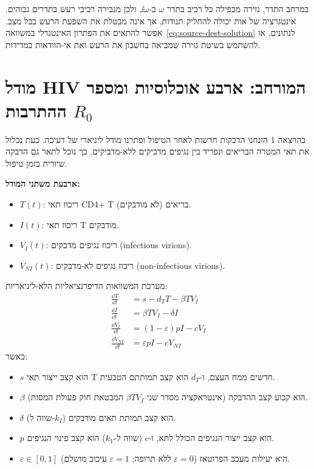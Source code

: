 \begin{remark}
במרחב התדר, גזירה מכפילה כל רכיב בתדר $\omega$ ב-$\ii\omega$, ולכן מגבירה רכיבי רעש בתדרים גבוהים. אינטגרציה של אות יכולה להחליק תנודות, אך אינה מבטלת את השפעת הרעש בכל מצב. אפשר להתאים את הפתרון האינטגרלי במשוואה~\eqref{eq:source-dest-solution} לנתונים, או להשתמש בשיטת גזירה שמביאה בחשבון את הרעש ואת אי-הוודאות במדידות.
\end{remark}

\section{מודל HIV המורחב: ארבע אוכלוסיות ומספר ההתרבות \texorpdfstring{$R_0$}{R0}}\label{sec:hiv-4pop}
בהרצאה 1 הזנחנו הדבקות חדשות לאחר הטיפול ופתרנו מודל ליניארי של דעיכה. כעת נכלול את תאי המטרה הבריאים ונפריד בין נגיפים מדביקים ללא-מדביקים. כך נוכל לתאר גם הדבקה שיורית בזמן טיפול.

\textbf{ארבעת משתני המודל:}
\begin{itemize}
\item $T(t)$: ריכוז תאי CD4+ T בריאים (לא מודבקים).
\item $I(t)$: ריכוז תאי T מודבקים.
\item $V_I(t)$: ריכוז נגיפים מדבקים (\textenglish{infectious virions}).
\item $V_{NI}(t)$: ריכוז נגיפים לא-מדבקים (\textenglish{non-infectious virions}).
\end{itemize}

מערכת המשוואות הדיפרנציאליות הלא-ליניאריות:
\begin{align}
\frac{\dd T}{\dd t} &= s - d_T T - \beta T V_I \label{eq:hiv4-T}\\
\frac{\dd I}{\dd t} &= \beta T V_I - \delta I \label{eq:hiv4-I}\\
\frac{\dd V_I}{\dd t} &= (1-\varepsilon) p I - c V_I \label{eq:hiv4-VI}\\
\frac{\dd V_{NI}}{\dd t} &= \varepsilon p I - c V_{NI} \label{eq:hiv4-VNI}
\end{align}
כאשר:
\begin{itemize}
\item $s$ הוא קצב ייצור תאי T חדשים ממח העצם, ו-$d_T$ הוא קצב תמותתם הטבעית.
\item $\beta$ הוא קבוע קצב ההדבקה (אינטראקציה מסדר שני $\beta T V_I$ המבטאת חוק פעולת המסות).
\item $\delta$ (שווה ל-$k_I$) הוא קצב תמותת תאים מודבקים.
\item $p$ הוא קצב ייצור הנגיפים הכולל לתא, ו-$c$ (שווה ל-$k_V$) הוא קצב פינוי הנגיפים.
\item $\varepsilon \in [0, 1]$ היא יעילות מעכב הפרוטאז ($\varepsilon=0$ ללא תרופה; $\varepsilon=1$ עיכוב מושלם).
\end{itemize}

